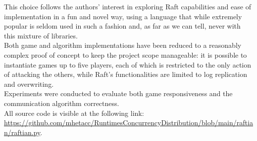 This choice follows the authors' interest in exploring Raft capabilities and ease of implementation in a fun and novel way, using a language that while extremely popular is seldom used in such a fashion and, as far as we can tell, never with this mixture of libraries.\\
Both game and algorithm implementations have been reduced to a reasonably complex proof of concept to keep the project scope manageable: it is possible to instantiate games up to five players, each of which is restricted to the only action of attacking the others, while Raft's functionalities are limited to log replication and overwriting. \\
Experiments were conducted to evaluate both game responsiveness and the communication algorithm correctness. \\
All source code is visible at the following link: \url{https://github.com/mhetacc/RuntimesConcurrencyDistribution/blob/main/raftian/raftian.py}.



